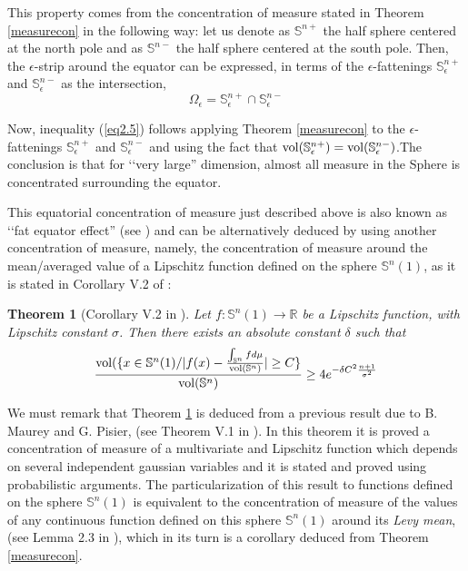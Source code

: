 \documentclass[11pt,letterpaper]{amsart}
\newtheorem{theoremA}{Theorem}
\theoremstyle{definition}
\theoremstyle{remark}
\newcommand{\erre}{\mathbb{R}}
\newcommand{\ese}{\mathbb{S}}
\begin{document}
This property comes from the concentration of measure stated in Theorem \ref{measurecon} in the following way: let us denote as $\mathbb{S}^{n+}$ the half sphere centered at the north pole and  as $\mathbb{S}^{n-}$ the half sphere centered at the south pole. Then, the $\epsilon$-strip around the equator can be expressed, in terms of the $\epsilon$-fattenings $\mathbb{S}^{n+}_{\epsilon}$ and $\mathbb{S}^{n-}_{\epsilon}$ as the intersection, 
$$\Omega_\epsilon=\mathbb{S}^{n+}_{\epsilon} \cap\mathbb{S}^{n-}_{\epsilon} $$


\noindent Now, inequality (\ref{eq2.5}) follows applying Theorem \ref{measurecon} to the $\epsilon$-fattenings $\mathbb{S}^{n+}_{\epsilon}$ and $\mathbb{S}^{n-}_{\epsilon}$ and using the fact that ${\rm vol}(\mathbb{S}^{n+}_\epsilon)={\rm vol}(\mathbb{S}^{n-}_\epsilon)$.The conclusion is that for  \lq\lq very large'' dimension,  almost all measure in the Sphere is concentrated surrounding  the equator. 

This equatorial concentration of measure just described above is also known as \lq\lq fat equator effect'' (see \cite{Bengtsson}) 
and can be alternatively deduced by using another concentration of measure, namely, the concentration of measure around the mean/averaged value of a Lipschitz function defined on the sphere $\ese^n(1)$, as it is stated in Corollary V.2 of \cite{MS}:

\begin{theoremA}[Corollary V.2 in \cite{MS}]\label{thB}
Let $f: \ese^n(1) \rightarrow \erre$ be a Lipschitz function, with Lipschitz constant $\sigma$. Then there exists an absolute constant $\delta$ such that
\begin{equation}
\frac{{\rm vol}(\{ x \in \ese^n(1) / \vert f(x)- \frac{\int_{\ese^n} f d\mu}{{\rm vol}(\ese^n)}\vert\geq C\} }{{\rm vol}(\ese^n) } \geq 4 e^{-\delta C^2\frac{n+1}{\sigma^2}}
\end{equation}

\end{theoremA}
We must remark that Theorem \ref{thB} is deduced from a previous result due to B. Maurey and G. Pisier, (see Theorem V.1 in \cite{MS}). In this theorem it is proved a concentration of measure of a multivariate and Lipschitz function which depends on several independent gaussian variables and it is stated and proved using probabilistic arguments. The particularization of this result to  functions defined on the sphere $\ese^n(1)$ is equivalent to the concentration of measure of the values of any continuous function defined on this sphere $\ese^n(1)$ around its {\em Levy mean}, (see Lemma 2.3 in \cite{MS}), which in its turn is a corollary deduced from Theorem \ref{measurecon}. 
\end{document}
